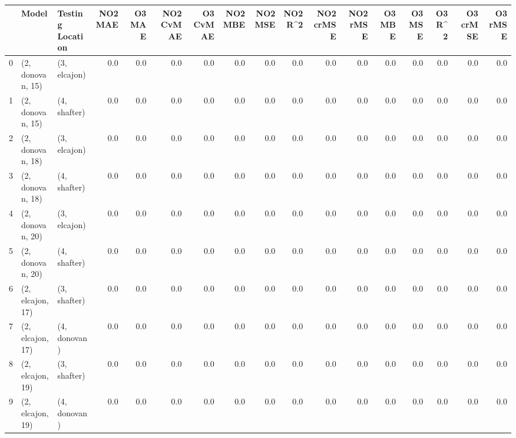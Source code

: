 \begin{tabular}{lllrrrrrrrrrrrrrr}
\toprule
{} &             Model & Testing Location &  NO2 MAE &  O3 MAE &  NO2 CvMAE &  O3 CvMAE &  NO2 MBE &  NO2 MSE &  NO2 R\textasciicircum2 &  NO2 crMSE &  NO2 rMSE &  O3 MBE &  O3 MSE &  O3 R\textasciicircum2 &  O3 crMSE &  O3 rMSE \\
\midrule
0  &  (2, donovan, 15) &     (3, elcajon) &      0.0 &     0.0 &        0.0 &       0.0 &      0.0 &      0.0 &      0.0 &        0.0 &       0.0 &     0.0 &     0.0 &     0.0 &       0.0 &      0.0 \\
1  &  (2, donovan, 15) &     (4, shafter) &      0.0 &     0.0 &        0.0 &       0.0 &      0.0 &      0.0 &      0.0 &        0.0 &       0.0 &     0.0 &     0.0 &     0.0 &       0.0 &      0.0 \\
2  &  (2, donovan, 18) &     (3, elcajon) &      0.0 &     0.0 &        0.0 &       0.0 &      0.0 &      0.0 &      0.0 &        0.0 &       0.0 &     0.0 &     0.0 &     0.0 &       0.0 &      0.0 \\
3  &  (2, donovan, 18) &     (4, shafter) &      0.0 &     0.0 &        0.0 &       0.0 &      0.0 &      0.0 &      0.0 &        0.0 &       0.0 &     0.0 &     0.0 &     0.0 &       0.0 &      0.0 \\
4  &  (2, donovan, 20) &     (3, elcajon) &      0.0 &     0.0 &        0.0 &       0.0 &      0.0 &      0.0 &      0.0 &        0.0 &       0.0 &     0.0 &     0.0 &     0.0 &       0.0 &      0.0 \\
5  &  (2, donovan, 20) &     (4, shafter) &      0.0 &     0.0 &        0.0 &       0.0 &      0.0 &      0.0 &      0.0 &        0.0 &       0.0 &     0.0 &     0.0 &     0.0 &       0.0 &      0.0 \\
6  &  (2, elcajon, 17) &     (3, shafter) &      0.0 &     0.0 &        0.0 &       0.0 &      0.0 &      0.0 &      0.0 &        0.0 &       0.0 &     0.0 &     0.0 &     0.0 &       0.0 &      0.0 \\
7  &  (2, elcajon, 17) &     (4, donovan) &      0.0 &     0.0 &        0.0 &       0.0 &      0.0 &      0.0 &      0.0 &        0.0 &       0.0 &     0.0 &     0.0 &     0.0 &       0.0 &      0.0 \\
8  &  (2, elcajon, 19) &     (3, shafter) &      0.0 &     0.0 &        0.0 &       0.0 &      0.0 &      0.0 &      0.0 &        0.0 &       0.0 &     0.0 &     0.0 &     0.0 &       0.0 &      0.0 \\
9  &  (2, elcajon, 19) &     (4, donovan) &      0.0 &     0.0 &        0.0 &       0.0 &      0.0 &      0.0 &      0.0 &        0.0 &       0.0 &     0.0 &     0.0 &     0.0 &       0.0 &      0.0 \\

\end{tabular}
